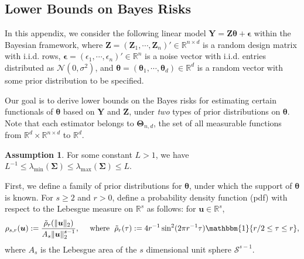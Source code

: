 \documentclass[aos,preprint]{imsart}
\theoremstyle{plain}
\theoremstyle{definition}
\newtheorem{assumption}{Assumption}
\newcommand{\btheta}{\boldsymbol{\theta}}
\newcommand{\bd}[1]{\boldsymbol{#1}}
\newcommand{\hbtheta}{\widehat{\boldsymbol{\theta}}}
\newcommand{\idf}{\mathbbm{1}}
\newcommand{\bSigma}{\boldsymbol{\Sigma}}
\newcommand{\lmin}[1]{\lambda_{\min}\left(#1\right)}
\newcommand{\lmax}[1]{\lambda_{\max}\left(#1\right)}
\newcommand{\mR}{\mathbb{R}}
\newcommand{\mS}{\mathcal{S}}
\newcommand{\bY}{\boldsymbol{Y}}
\newcommand{\bu}{\boldsymbol{u}}
\newcommand{\bZ}{\boldsymbol{Z}}
\newcommand{\bepsilon}{\bd{\epsilon}}
\newcommand{\Exp}{\mathbb{E}}
\begin{document}
\begin{appendix}
\section{Lower Bounds on Bayes Risks}
In this appendix, we consider the following linear model $\bY = \bZ\btheta +\bepsilon$ within the Bayesian framework, where $\bZ = (\bZ_1,\cdots,\bZ_n)'\in \mR^{n\times d}$ is a random design matrix with i.i.d. rows, $\bepsilon = (\epsilon_1, \cdots, \epsilon_n)'\in \mR^n$ is a noise vector with i.i.d. entries distributed as $\mathcal{N}(0,\sigma^2)$, and $\btheta = (\btheta_1,\cdots, \btheta_d) \in \mathbb{R}^{d}$ is a random vector with some prior distribution to be specified. 



Our goal is to derive lower bounds on the Bayes risks for estimating certain functionals of $\btheta$ based on  $\bY$ and $\bZ$, under \textit{two} types of prior distributions on $\btheta$. Note that each estimator belongs to $\bd{\Theta}_{n,d}$, the set of all measurable functions from $\mathbb{R}^{d} \times \mathbb{R}^{n \times d}$ to $\mathbb{R}^{d}$. 



\begin{assumption}\label{assumption: bounded cov mat 2}
For some constant $L>1$, we have $L^{-1}\le \lmin{\bSigma}\le\lmax{\bSigma}\le L$. 
\end{assumption}

First, we define a family of prior distributions for $\btheta$, under which the support of $\btheta$ is known. For $s\ge 2$ and $r > 0$, define  a probability density function (pdf) with respect to the Lebesgue measure on $\mathbb{R}^{s}$ as follows: for $\bu \in \mathbb{R}^{s}$,
$$\rho_{s,r}(\bu) := \frac{\tilde{\rho}_r(\|\bu\|_2)}{A_{s}\|\bu\|_2^{s-1}}, \quad \text{ where }  \;\tilde{\rho}_r(\tau) := 4r^{-1}\sin^2(2\pi r^{-1} \tau)\idf\{r/2 \le \tau\le r\},$$
where $A_{s}$ is the Lebesgue area of the $s$ dimensional unit sphere $\mS^{s-1}$. 







\end{appendix}
\end{document}
